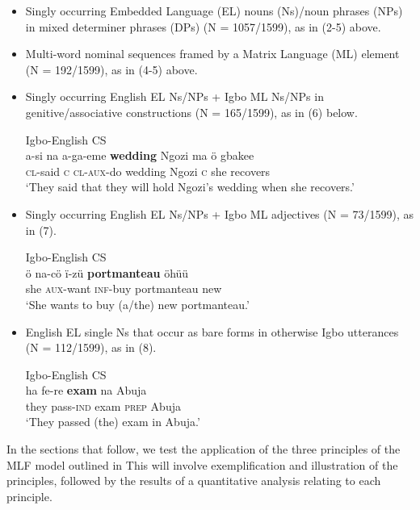 \documentclass[output=paper]{langsci/langscibook}
\begin{document}
\begin{itemize}
 \item Singly occurring Embedded Language (EL) nouns (Ns)/noun phrases (NPs) in mixed determiner phrases (DPs) (N = 1057/1599), as in (2-5) above. 

 \item Multi-word nominal sequences framed by a Matrix Language (ML) element (N = 192/1599), as in (4-5) above.

 \item Singly occurring English EL Ns/NPs + Igbo ML Ns/NPs in genitive/associative constructions (N = 165/1599), as in (6) below.
 
\ea
{Igbo-English \textsc{CS}}\\
\gll a-si    na  a-ga-eme   \textbf{wedding  }Ngozi  ma   ö  gbakee\\
     \textsc{cl}{}-said  \textsc{c  cl-aux}{}-do  wedding  Ngozi  \textsc{c}\textsubscript{  }she  recovers\\
\glt ‘They said that they will hold Ngozi’s wedding when she recovers.’
\z

\item Singly occurring English EL Ns/NPs + Igbo ML adjectives (N = 73/1599), as in (7).
 

\ea
{Igbo-English \textsc{CS}}\\
\gll ö  na-cö    ï-zü    \textbf{portmanteau  }öhüü \\
     she  \textsc{aux}{}-want  \textsc{inf}{}-buy  portmanteau  new\\
\glt ‘She wants to buy (a/the) new portmanteau.’
\z
\item English EL single Ns that occur as bare forms in otherwise Igbo utterances (N = 112/1599), as in (8).


\ea
{Igbo-English \textsc{CS}}\\
\gll ha    fe-re    \textbf{exam}  na   Abuja\\
     they  pass-\textsc{ind}\textsubscript{  }exam  \textsc{prep}  Abuja \\
\glt ‘They passed (the) exam in Abuja.’
\z

\end{itemize}

In the sections that follow, we test the application of the three principles of the MLF model outlined in  This will involve exemplification and illustration of the principles, followed by the results of a quantitative analysis relating to each principle. 
\end{document}
